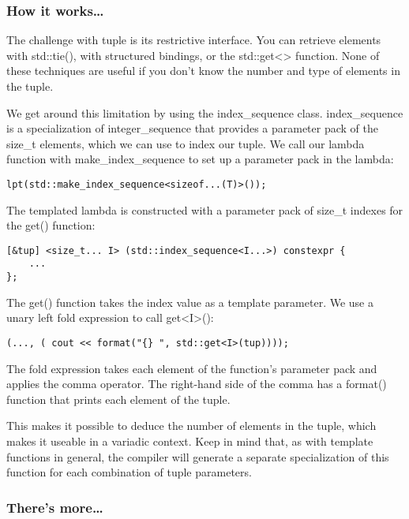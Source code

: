 \subsubsection{How it works…}

The challenge with tuple is its restrictive interface. You can retrieve elements with std::tie(), with structured bindings, or the std::get<> function. None of these techniques are useful if you don't know the number and type of elements in the tuple.

We get around this limitation by using the index\_sequence class. index\_sequence is a specialization of integer\_sequence that provides a parameter pack of the size\_t elements, which we can use to index our tuple. We call our lambda function with make\_index\_sequence to set up a parameter pack in the lambda:

\begin{lstlisting}[style=styleCXX]
lpt(std::make_index_sequence<sizeof...(T)>());
\end{lstlisting}

The templated lambda is constructed with a parameter pack of size\_t indexes for the get() function:

\begin{lstlisting}[style=styleCXX]
[&tup] <size_t... I> (std::index_sequence<I...>) constexpr {
	...
};
\end{lstlisting}

The get() function takes the index value as a template parameter. We use a unary left fold expression to call get<I>():

\begin{lstlisting}[style=styleCXX]
(..., ( cout << format("{} ", std::get<I>(tup))));
\end{lstlisting}

The fold expression takes each element of the function's parameter pack and applies the comma operator. The right-hand side of the comma has a format() function that prints each element of the tuple.

This makes it possible to deduce the number of elements in the tuple, which makes it useable in a variadic context. Keep in mind that, as with template functions in general, the compiler will generate a separate specialization of this function for each combination of tuple parameters.


\subsubsection{There's more…}

